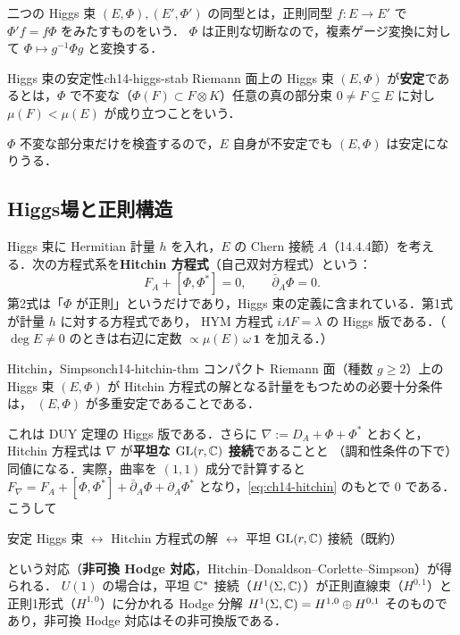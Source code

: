 二つの Higgs 束 $(E,\Phi),(E',\Phi')$ の同型とは，正則同型 $f:E\to E'$ で $\Phi' f = f\Phi$ をみたすものをいう．
$\Phi$ は正則な切断なので，複素ゲージ変換に対して $\Phi\mapsto g^{-1}\Phi g$ と変換する．

\begin{mydef}{Higgs 束の安定性}{ch14-higgs-stab}
Riemann 面上の Higgs 束 $(E,\Phi)$ が\textbf{安定}であるとは，$\Phi$ で不変な（$\Phi(F)\subset F\otimes K$）任意の真の部分束 $0\neq F\subsetneq E$ に対し
$\mu(F)<\mu(E)$ が成り立つことをいう．
\end{mydef}
$\Phi$ 不変な部分束だけを検査するので，$E$ 自身が不安定でも $(E,\Phi)$ は安定になりうる．

\subsection{Higgs場と正則構造}

Higgs 束に Hermitian 計量 $h$ を入れ，$E$ の Chern 接続 $A$（14.4.4節）を考える．次の方程式系を\textbf{Hitchin 方程式}（自己双対方程式）という：
\begin{equation}
  F_A + [\Phi,\Phi^*] = 0,\qquad \bar\partial_A\Phi = 0.
  \label{eq:ch14-hitchin}
\end{equation}
第2式は「$\Phi$ が正則」というだけであり，Higgs 束の定義に含まれている．第1式が計量 $h$ に対する方程式であり，
HYM 方程式 $i\Lambda F=\lambda$ の Higgs 版である．（$\deg E\neq0$ のときは右辺に定数 $\propto\mu(E)\,\omega\,\mathbf{1}$ を加える．）

\begin{mythm}{Hitchin，Simpson}{ch14-hitchin-thm}
コンパクト Riemann 面（種数 $g\geq2$）上の Higgs 束 $(E,\Phi)$ が Hitchin 方程式の解となる計量をもつための必要十分条件は，
$(E,\Phi)$ が多重安定であることである．
\end{mythm}

これは DUY 定理の Higgs 版である．さらに $\nabla := D_A + \Phi + \Phi^*$ とおくと，Hitchin 方程式は $\nabla$ が\textbf{平坦な $\operatorname{GL}(r,\mathbb{C})$ 接続}であることと
（調和性条件の下で）同値になる．実際，曲率を $(1,1)$ 成分で計算すると
$F_\nabla = F_A + [\Phi,\Phi^*] + \bar\partial_A\Phi + \partial_A\Phi^*$ となり，\eqref{eq:ch14-hitchin} のもとで $0$ である．
こうして
\begin{center}
安定 Higgs 束 $\longleftrightarrow$ Hitchin 方程式の解 $\longleftrightarrow$ 平坦 $\operatorname{GL}(r,\mathbb{C})$ 接続（既約）
\end{center}
という対応（\textbf{非可換 Hodge 対応}，Hitchin--Donaldson--Corlette--Simpson）が得られる．
$U(1)$ の場合は，平坦 $\mathbb{C}^*$ 接続（$H^1(\Sigma,\mathbb{C})$）が正則直線束（$H^{0,1}$）と正則1形式（$H^{1,0}$）に分かれる Hodge 分解
$H^1(\Sigma,\mathbb{C})=H^{1,0}\oplus H^{0,1}$ そのものであり，非可換 Hodge 対応はその非可換版である．

